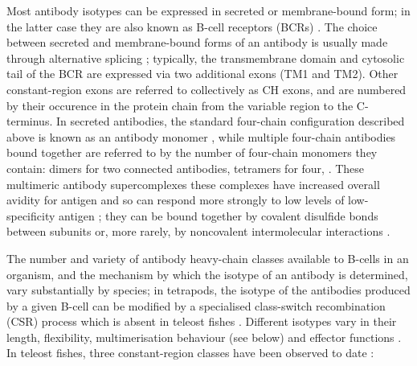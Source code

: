 Most antibody isotypes can be expressed in secreted or membrane-bound form; in the latter case they are also known as B-cell receptors (BCRs) \parencite{bengten2015fishantibodies}. The choice between secreted and membrane-bound forms of an antibody is usually made through alternative splicing \parencite{bengten2015fishantibodies,mashoof2016immunoglobulins}; typically, the transmembrane domain and cytosolic tail of the BCR are expressed via two additional exons (TM1 and TM2). Other constant-region exons are referred to collectively as CH exons, and are numbered by their occurence in the protein chain from the variable region to the C-terminus. In secreted antibodies, the standard four-chain configuration described above is known as an antibody monomer \parencite{mix2006immunoglobulins}, while multiple four-chain antibodies bound together are referred to by the number of four-chain monomers they contain: dimers for two connected antibodies, tetramers for four, \etc \parencite{mix2006immunoglobulins,schroeder2010immunoglobulins}. These multimeric antibody supercomplexes these complexes have increased overall avidity for antigen and so can respond more strongly to low levels of low-specificity antigen \parencite{mix2006immunoglobulins}; they can be bound together by covalent disulfide bonds between subunits \parencite{schroeder2010immunoglobulins} or, more rarely, by noncovalent intermolecular interactions \parencite{zhang2010igtgut}.

The number and variety of antibody heavy-chain classes available to B-cells in an organism, and the mechanism by which the isotype of an antibody is determined, vary substantially by species; in tetrapods, the isotype of the antibodies produced by a given B-cell can be modified by a specialised class-switch recombination (CSR) process which is absent in teleost fishes \parencite{senger2015switching}. Different isotypes vary in their length, flexibility, multimerisation behaviour (see below) and effector functions \parencite{schroeder2010immunoglobulins,senger2015switching}. In teleost fishes, three constant-region classes have been observed to date \parencite{bengten2015fishantibodies,mashoof2016immunoglobulins, fillatreau2013astonishing,hikima2011ig}:

